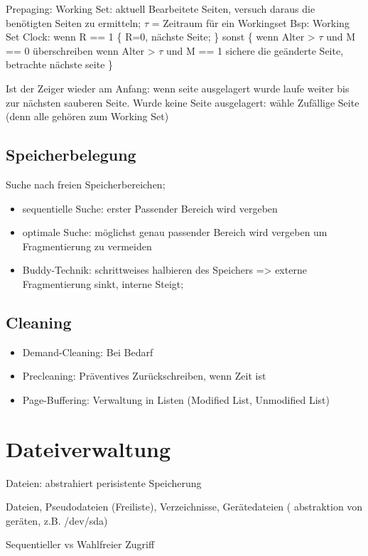 Prepaging: Working Set: aktuell Bearbeitete Seiten, versuch daraus die benötigten Seiten zu ermitteln; $\tau$ = Zeitraum für ein Workingset
Bsp: Working Set Clock: 
wenn R == 1
\{ R=0, nächste Seite; \}
sonst
\{ wenn Alter > $\tau$ und M == 0 überschreiben 
   wenn Alter > $\tau $ und M == 1 sichere die geänderte Seite, betrachte nächste seite
\}


Ist der Zeiger wieder am Anfang: wenn seite ausgelagert wurde laufe weiter bis zur nächsten sauberen Seite.
Wurde keine Seite ausgelagert: wähle Zufällige Seite (denn alle gehören zum Working Set)

\subsection*{Speicherbelegung}
Suche nach freien Speicherbereichen; 
\begin{itemize}
\item sequentielle Suche: erster Passender Bereich wird vergeben
\item optimale Suche: möglichst genau passender Bereich wird vergeben um Fragmentierung zu vermeiden
\item Buddy-Technik: schrittweises halbieren des Speichers => externe Fragmentierung sinkt, interne Steigt;
\end{itemize}

\subsection*{Cleaning}
\begin{itemize}
\item Demand-Cleaning: Bei Bedarf
\item Precleaning: Präventives Zurückschreiben, wenn Zeit ist
\item Page-Buffering: Verwaltung in Listen (Modified List, Unmodified List)
\end{itemize}

\section*{Dateiverwaltung}
Dateien: abstrahiert perisistente Speicherung

Dateien, Pseudodateien (Freiliste), Verzeichnisse, Gerätedateien ( abstraktion von geräten, z.B. /dev/sda)

Sequentieller vs Wahlfreier Zugriff